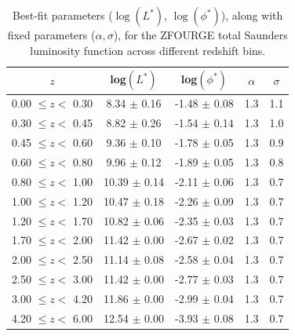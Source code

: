 \begin{table}
    \caption{Best-fit parameters ($\log(L^*)$, $\log(\phi^*)$), along with fixed parameters ($\alpha, \sigma$), for the ZFOURGE total Saunders luminosity function across different redshift bins.}
    \label{Tab: Param Evo ZF}
    \begin{center}
    \begin{tabular}{ccccc}
        \toprule
        $z$ & log$(L^{*})$ & log$(\phi^{*})$ & $\alpha$ & $\sigma$ \\
        \hline
        0.00 $\leq z <$ 0.30 &  8.34 $\pm$ 0.16 & -1.48 $\pm$ 0.08 & 1.3 & 1.1 \\
        0.30 $\leq z <$ 0.45 &  8.82 $\pm$ 0.26 & -1.54 $\pm$ 0.14 & 1.3 & 1.0 \\
        0.45 $\leq z <$ 0.60 &  9.36 $\pm$ 0.10 & -1.78 $\pm$ 0.05 & 1.3 & 0.9 \\
        0.60 $\leq z <$ 0.80 &  9.96 $\pm$ 0.12 & -1.89 $\pm$ 0.05 & 1.3 & 0.8 \\
        0.80 $\leq z <$ 1.00 & 10.39 $\pm$ 0.14 & -2.11 $\pm$ 0.06 & 1.3 & 0.7 \\
        1.00 $\leq z <$ 1.20 & 10.47 $\pm$ 0.18 & -2.26 $\pm$ 0.09 & 1.3 & 0.7 \\
        1.20 $\leq z <$ 1.70 & 10.82 $\pm$ 0.06 & -2.35 $\pm$ 0.03 & 1.3 & 0.7 \\
        1.70 $\leq z <$ 2.00 & 11.42 $\pm$ 0.00 & -2.67 $\pm$ 0.02 & 1.3 & 0.7 \\
        2.00 $\leq z <$ 2.50 & 11.14 $\pm$ 0.08 & -2.58 $\pm$ 0.04 & 1.3 & 0.7 \\
        2.50 $\leq z <$ 3.00 & 11.42 $\pm$ 0.00 & -2.77 $\pm$ 0.03 & 1.3 & 0.7 \\
        3.00 $\leq z <$ 4.20 & 11.86 $\pm$ 0.00 & -2.99 $\pm$ 0.04 & 1.3 & 0.7 \\
        4.20 $\leq z <$ 6.00 & 12.54 $\pm$ 0.00 & -3.93 $\pm$ 0.08 & 1.3 & 0.7 \\
        \bottomrule
    \end{tabular}
    \end{center}
\end{table}

